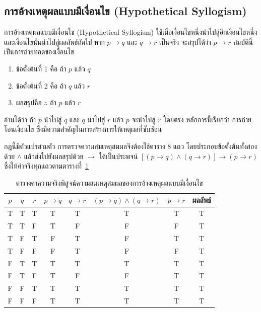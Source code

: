 \subsection{การอ้างเหตุผลแบบมีเงื่อนไข (Hypothetical Syllogism)}

การอ้างเหตุผลแบบมีเงื่อนไข (Hypothetical Syllogism) ใช้เมื่อเงื่อนไขหนึ่งนำไปสู่อีกเงื่อนไขหนึ่ง และเงื่อนไขนั้นนำไปสู่ผลลัพธ์ถัดไป หาก $p \rightarrow q$ และ $q \rightarrow r$ เป็นจริง จะสรุปได้ว่า $p \rightarrow r$ สมบัตินี้เป็นการถ่ายทอดของเงื่อนไข~\parencite{enderton2001logic}

\begin{enumerate}
    \item ข้อตั้งต้นที่ 1 คือ ถ้า $p$ แล้ว $q$
    \item ข้อตั้งต้นที่ 2 คือ ถ้า $q$ แล้ว $r$
    \item ผลสรุปคือ $\therefore$ ถ้า $p$ แล้ว $r$
\end{enumerate}

อ่านได้ว่า ถ้า $p$ นำไปสู่ $q$ และ $q$ นำไปสู่ $r$ แล้ว $p$ จะนำไปสู่ $r$ โดยตรง หลักการนี้เรียกว่า การถ่ายโอนเงื่อนไข ซึ่งมีความสำคัญในการสร้างการให้เหตุผลที่ซับซ้อน

กฎนี้มีตัวแปรสามตัว การตรวจความสมเหตุสมผลจึงต้องใช้ตาราง 8 แถว โดยประกอบข้อตั้งต้นทั้งสองด้วย $\land$ แล้วส่งไปยังผลสรุปด้วย $\rightarrow$ ได้เป็นประพจน์ $[(p \rightarrow q) \land (q \rightarrow r)] \rightarrow (p \rightarrow r)$ ซึ่งให้ค่าจริงทุกแถวตามตารางที่~\ref{tab:hs-valid}

\begin{table}[H]
    \centering
    \small
    \caption{ตารางค่าความจริงพิสูจน์ความสมเหตุสมผลของการอ้างเหตุผลแบบมีเงื่อนไข}
    \label{tab:hs-valid}
    \begin{tabular}{|c|c|c|c|c|c|c|c|}
        \hline
        $p$ & $q$ & $r$ & $p \rightarrow q$ & $q \rightarrow r$ & $(p \rightarrow q) \land (q \rightarrow r)$ & $p \rightarrow r$ & ผลลัพธ์ \\ \hline
        T & T & T & T & T & T & T & T \\ \hline
        T & T & F & T & F & F & F & T \\ \hline
        T & F & T & F & T & F & T & T \\ \hline
        T & F & F & F & T & F & F & T \\ \hline
        F & T & T & T & T & T & T & T \\ \hline
        F & T & F & T & F & F & T & T \\ \hline
        F & F & T & T & T & T & T & T \\ \hline
        F & F & F & T & T & T & T & T \\ \hline
    \end{tabular}
\end{table}

